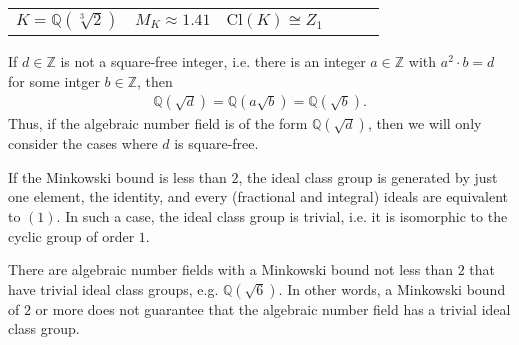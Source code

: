 \begin{center}
    \begin{tabular}{ c c c | c c c}
     \(K = \mathbb{Q}(\sqrt[3]{2})\) & \(M_K \approx 1.41\) & \(\mathrm{Cl}(K) \cong Z_1 \) & & & \\
    \end{tabular}
\end{center}

\begin{rembox}
    \begin{remark}
        If \(d \in \mathbb{Z}\) is not a square-free integer, i.e. there is an integer \(a \in \mathbb{Z}\) with \(a^2 \cdot b = d\) for some intger \(b \in \mathbb{Z}\), then
        \begin{align*}
            \mathbb{Q}\left(\sqrt{d}\right) = \mathbb{Q}\left(a \sqrt{b}\right) = \mathbb{Q}\left(\sqrt{b}\right) \text{.}
        \end{align*}
        Thus, if the algebraic number field is of the form \(\mathbb{Q} (\sqrt{d})\), then we will only consider the cases where \(d\) is square-free.
    \end{remark}
\end{rembox}

\begin{rembox}
    \begin{remark}
        If the Minkowski bound is less than \(2\), the ideal class group is generated by just one element, the identity, and every (fractional and integral) ideals are equivalent to \((1)\). In such a case, the ideal class group is trivial, i.e. it is isomorphic to the cyclic group of order \(1\).

        There are algebraic number fields with a Minkowski bound not less than \(2\) that have trivial ideal class groups, e.g. \(\mathbb{Q}(\sqrt{6})\). In other words, a Minkowski bound of \(2\) or more does not guarantee that the algebraic number field has a trivial ideal class group.
    \end{remark}    
\end{rembox}

